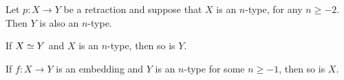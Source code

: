 \documentclass[hott-all.tex]{subfiles}
\begin{document}
% 
% 
\begin{thm}
 Let $p : X \to Y$ be a retraction and suppose that $X$ is an $n$-type, for any $n\geq -2$.
 Then $Y$ is also an $n$-type.
\end{thm}
% 
% 
% 
% 
\begin{cor}
 If $X \simeq Y$ and $X$ is an $n$-type, then so is $Y$.
\end{cor}
% 
% 
\begin{thm}
  If $f:X\to Y$ is an embedding and $Y$ is an $n$-type for some $n\ge -1$, then so is $X$.
\end{thm}
% 
\end{document}
